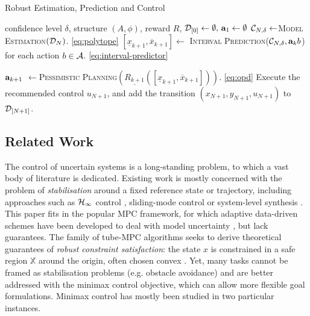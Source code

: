 \documentclass{article}
\begin{document}
\begin{algorithm}[tb]
	\caption{Robust Estimation, Prediction and Control}
	\label{alg:full}
	\begin{algorithmic}
		 confidence level $\delta$, structure $(A,\phi)$, reward $R$, $\mathcal{D}_{[0]}\gets\emptyset,\, \mathbf{a}_1\gets\emptyset$
		\STATE $\mathcal{C}_{N,\delta} \gets$\textsc{Model Estimation}$(\mathcal{D}_{N})$. \eqref{eq:polytope}
		\STATE $[\underline{x}_{k+1}, \overline{x}_{k+1}]\gets$ \textsc{Interval Prediction}($\mathcal{C}_{N,\delta}, \mathbf{a}_kb$) for each action $b\in \mathcal{A}$. \eqref{eq:interval-predictor}

		\STATE $\mathbf{a}_{k+1}$ $\gets$\textsc{Pessimistic Planning}$(\underline{R_{k+1}}([\underline{x}_{k+1}, \overline{x}_{k+1}]))$.  \eqref{eq:opd}
		\ENDFOR
		\STATE Execute the recommended control $u_{N+1}$, and add the transition $(x_{N+1}, y_{N+1}, u_{N+1})$ to $\mathcal{D}_{[N+1]}$.
		\ENDFOR
	\end{algorithmic}
\end{algorithm}

\subsection{Related Work}

The control of uncertain systems is a long-standing problem, to which a vast body of literature is dedicated. Existing work is mostly concerned with the problem of \emph{stabilisation} around a fixed reference state or trajectory, including approaches such as $\mathcal{H}_\infty$ control \citep[][]{Basar1996}, sliding-mode control \citep{Lu1997} or system-level synthesis \citep{Dean2017,Dean2018}. This paper fits in the popular MPC framework, for which adaptive data-driven schemes have been developed to deal with model uncertainty \citep{Sastry1990,Tanaskovic2014,Amos2018}, but lack guarantees. The family of tube-MPC algorithms seeks to derive theoretical guarantees of \emph{robust constraint satisfaction}: the state $x$ is constrained in a safe region $\mathbb{X}$ around the origin, often chosen convex \citep{Fukushima2007,Adetola2009,Aswani2013,Turchetta2016,Lorenzen2017,Kohler2019,Lu2019,Leurent2020robust}.
Yet, many tasks cannot be framed as stabilisation problems (e.g. obstacle avoidance) and are better addressed with the minimax control objective, which can allow more flexible goal formulations. Minimax control has mostly been studied in two particular instances.
\end{document}
